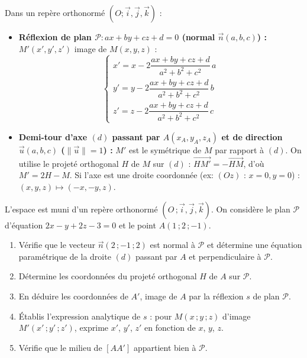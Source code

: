 \documentclass[11pt]{article}
\begin{document}
\begin{aretenir}
Dans un repère orthonormé $(O;\vec{i},\vec{j},\vec{k})$ :
\begin{itemize}
\item \textbf{Réflexion de plan $\mathcal{P}: ax+by+cz+d=0$ (normal $\vec{n}(a,b,c)$) :}
$M'(x',y',z')$ image de $M(x,y,z)$ :
\[
\begin{cases}
x' = x - 2\dfrac{ax+by+cz+d}{a^2+b^2+c^2}\,a \\[6pt]
y' = y - 2\dfrac{ax+by+cz+d}{a^2+b^2+c^2}\,b \\[6pt]
z' = z - 2\dfrac{ax+by+cz+d}{a^2+b^2+c^2}\,c
\end{cases}
\]
\item \textbf{Demi-tour d'axe $(d)$ passant par $A(x_A,y_A,z_A)$ et de direction $\vec{u}(a,b,c)$ ($\|\vec{u}\|=1$) :}
$M'$ est le symétrique de $M$ par rapport à $(d)$. On utilise le projeté orthogonal $H$ de $M$ sur $(d)$ : $\overrightarrow{HM'} = -\overrightarrow{HM}$, d'où $M' = 2H - M$.
Si l'axe est une droite coordonnée (ex: $(Oz)$ : $x=0,y=0$) : $(x,y,z)\mapsto(-x,-y,z)$.
\end{itemize}
\end{aretenir}

\begin{exercice}
L'espace est muni d'un repère orthonormé $(O\,;\vec{i},\vec{j},\vec{k})$. On considère le plan $\mathcal{P}$ d'équation $2x-y+2z-3=0$ et le point $A(1\,;2\,;-1)$.
\begin{enumerate}
\item Vérifie que le vecteur $\vec{n}(2\,;-1\,;2)$ est normal à $\mathcal{P}$ et détermine une équation paramétrique de la droite $(d)$ passant par $A$ et perpendiculaire à $\mathcal{P}$.
\item Détermine les coordonnées du projeté orthogonal $H$ de $A$ sur $\mathcal{P}$.
\item En déduire les coordonnées de $A'$, image de $A$ par la réflexion $s$ de plan $\mathcal{P}$.
\item Établis l'expression analytique de $s$ : pour $M(x\,;y\,;z)$ d'image $M'(x'\,;y'\,;z')$, exprime $x'$, $y'$, $z'$ en fonction de $x$, $y$, $z$.
\item Vérifie que le milieu de $[AA']$ appartient bien à $\mathcal{P}$.
\end{enumerate}
\end{exercice}
\end{document}
